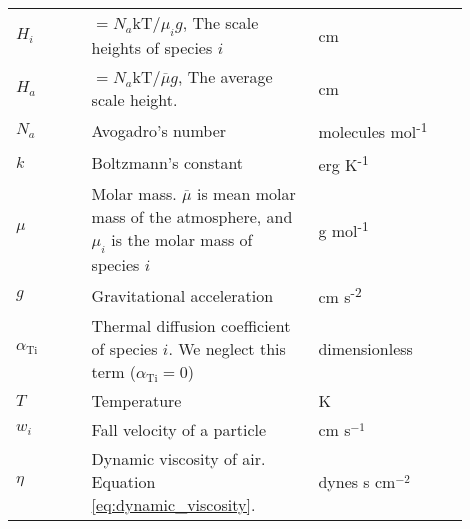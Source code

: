 \begin{table}
\begin{tabularx}{\linewidth}{p{0.15\linewidth} | p{0.45\linewidth} | p{0.3\linewidth}}
  \(H_{i}\) & \(= N_{a}\text{kT}\text{/}\mu_{i}g\), The scale heights of
  species \(i\) & cm \\
  \(H_{a}\) & \(= N_{a}\text{kT}\text{/}\overline{\mu}g\), The average
  scale height. & cm \\
  \(N_{a}\) & Avogadro's number & molecules
  mol\textsuperscript{-1} \\
  \(k\) & Boltzmann's constant & erg K\textsuperscript{-1} \\
  \(\mu\) & Molar mass. \(\overline{\mu}\) is mean molar mass of the
  atmosphere, and \(\mu_{i}\) is the molar mass of species \(i\) & g
  mol\textsuperscript{-1} \\
  \(g\) & Gravitational acceleration & cm
  s\textsuperscript{-2} \\
  \(\alpha_{\text{Ti}}\) & Thermal diffusion coefficient of species \(i\).
  We neglect this term (\(\alpha_{\text{Ti}} = 0\)) &
  dimensionless \\
  \(T\) & Temperature & K \\
  $w_i$ & Fall velocity of a particle & cm s$^{-1}$ \\
  $\eta$ & Dynamic viscosity of air. Equation \eqref{eq:dynamic_viscosity}. & dynes s cm$^{-2}$ \\
  \end{tabularx}
\end{table}